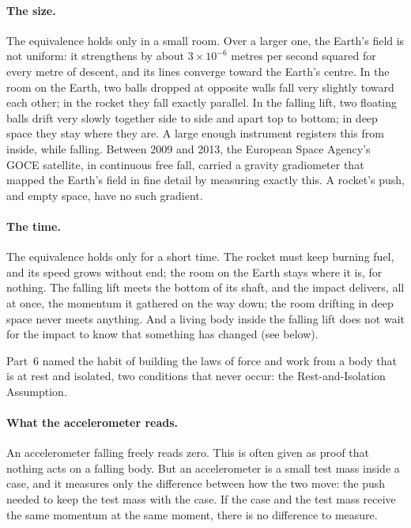 \paragraph{The size.} The equivalence holds only in a small room. Over a larger one, the Earth's field is not uniform: it strengthens by about $3\times10^{-6}$ metres per second squared for every metre of descent, and its lines converge toward the Earth's centre. In the room on the Earth, two balls dropped at opposite walls fall very slightly toward each other; in the rocket they fall exactly parallel. In the falling lift, two floating balls drift very slowly together side to side and apart top to bottom; in deep space they stay where they are. A large enough instrument registers this from inside, while falling. Between 2009 and 2013, the European Space Agency's GOCE satellite, in continuous free fall, carried a gravity gradiometer that mapped the Earth's field in fine detail by measuring exactly this. A rocket's push, and empty space, have no such gradient.

\paragraph{The time.} The equivalence holds only for a short time. The rocket must keep burning fuel, and its speed grows without end; the room on the Earth stays where it is, for nothing. The falling lift meets the bottom of its shaft, and the impact delivers, all at once, the momentum it gathered on the way down; the room drifting in deep space never meets anything. And a living body inside the falling lift does not wait for the impact to know that something has changed (see below).

 Part~6 named the habit of building the laws of force and work from a body that is at rest and isolated, two conditions that never occur: the Rest-and-Isolation Assumption. 

\paragraph{What the accelerometer reads.} An accelerometer falling freely reads zero. This is often given as proof that nothing acts on a falling body. But an accelerometer is a small test mass inside a case, and it measures only the difference between how the two move: the push needed to keep the test mass with the case. If the case and the test mass receive the same momentum at the same moment, there is no difference to measure. 

